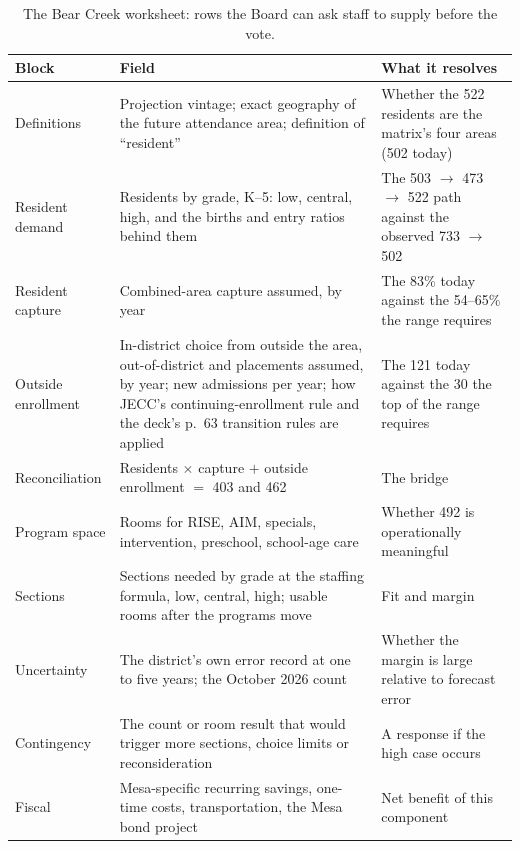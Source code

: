 \documentclass[11pt]{article}
\begin{document}
\begin{table}[htbp]\centering\small
\caption{The Bear Creek worksheet: rows the Board can ask staff to supply before the vote.}\label{tab:worksheet}
\begin{tabular}{p{2.5cm}p{5.5cm}p{6.0cm}}
\toprule
Block & Field & What it resolves \\
\midrule
Definitions & Projection vintage; exact geography of the future attendance area; definition of ``resident'' & Whether the 522 residents are the matrix's four areas (502 today) \\
Resident demand & Residents by grade, K--5: low, central, high, and the births and entry ratios behind them & The 503 $\to$ 473 $\to$ 522 path against the observed 733 $\to$ 502 \\
Resident capture & Combined-area capture assumed, by year & The 83\% today against the 54--65\% the range requires \\
Outside enrollment & In-district choice from outside the area, out-of-district and placements assumed, by year; new admissions per year; how JECC's continuing-enrollment rule and the deck's p.\ 63 transition rules are applied & The 121 today against the 30 the top of the range requires \\
Reconciliation & Residents $\times$ capture $+$ outside enrollment $=$ 403 and 462 & The bridge \\
Program space & Rooms for RISE, AIM, specials, intervention, preschool, school-age care & Whether 492 is operationally meaningful \\
Sections & Sections needed by grade at the staffing formula, low, central, high; usable rooms after the programs move & Fit and margin \\
Uncertainty & The district's own error record at one to five years; the October 2026 count & Whether the margin is large relative to forecast error \\
Contingency & The count or room result that would trigger more sections, choice limits or reconsideration & A response if the high case occurs \\
Fiscal & Mesa-specific recurring savings, one-time costs, transportation, the Mesa bond project & Net benefit of this component \\
\bottomrule
\end{tabular}
\end{table}
\end{document}
